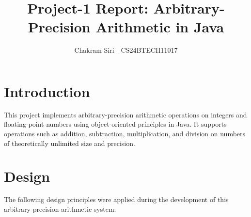 \documentclass{article}
\title{Project-1 Report: Arbitrary-Precision Arithmetic in Java}
\author{Chakram Siri - CS24BTECH11017}
\date{}
\begin{document}
\maketitle

\section{Introduction}
This project implements arbitrary-precision arithmetic operations on integers and floating-point numbers using object-oriented principles in Java. It supports operations such as addition, subtraction, multiplication, and division on numbers of theoretically unlimited size and precision.

\section{Design}
The following design principles were applied during the development of this arbitrary-precision arithmetic system:
\end{document}
